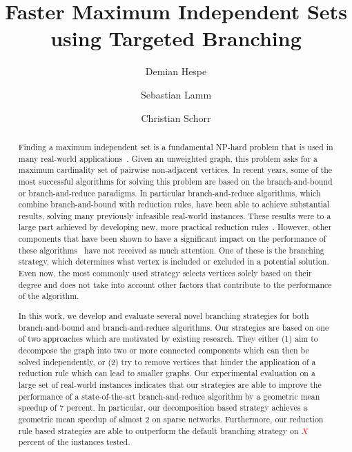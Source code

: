 \documentclass[a4paper,UKenglish,cleveref, autoref, thm-restate]{lipics-v2021}
\title{Faster Maximum Independent Sets using Targeted Branching} %
\author{Demian Hespe}{Karlsruhe Institute of Technology, Institute for
  Theoretical Informatics, Germany}{hespe@kit.edu}{https://orcid.org/0000-0001-6232-2951}{}
\author{Sebastian Lamm}{Karlsruhe Institute of Technology, Institute for
  Theoretical Informatics, Germany}{lamm@kit.edu}{}{\todo{Add funding}}
\author{Christian Schorr}{Karlsruhe Institute of Technology, Institute for
  Theoretical Informatics, Germany}{christian.schorr@student.kit.edu}{}{}
\begin{document}
\maketitle

\begin{abstract}
  Finding a maximum independent set is a fundamental NP-hard problem that is used in many real-world applications~\cite{BIO1,BIO2,RP,NW,CG}.
Given an unweighted graph, this problem asks for a maximum cardinality set of pairwise non-adjacent vertices.
In recent years, some of the most successful algorithms for solving this problem are based on the branch-and-bound or branch-and-reduce paradigms.
In particular branch-and-reduce algorithms, which combine branch-and-bound with reduction rules, have been able to achieve substantial results, solving many previously infeasible real-world instances.
These results were to a large part achieved by developing new, more practical reduction rules~\cite{alsahafy2020computing,ChangKern,dahlum2016accelerating,hespe2019scalable}.
However, other components that have been shown to have a significant impact on the performance of these algorithms~\cite{AkibaIwata} have not received as much attention.
One of these is the branching strategy, which determines what vertex is included or excluded in a potential solution.
Even now, the most commonly used strategy selects vertices solely based on their degree and does not take into account other factors that contribute to the performance of the algorithm.

In this work, we develop and evaluate several novel branching strategies for both branch-and-bound and branch-and-reduce algorithms.
Our strategies are based on one of two approaches which are motivated by existing research. 
They either (1) aim to decompose the graph into two or more connected components which can then be solved independently, or (2) try to remove vertices that hinder the application of a reduction rule which can lead to smaller graphs.
Our experimental evaluation on a large set of real-world instances indicates
that our strategies are able to improve the performance of a state-of-the-art
branch-and-reduce algorithm by a geometric mean speedup of $7$ percent. In particular, our
decomposition based strategy achieves a geometric mean speedup of almost 2 on sparse networks.
Furthermore, our reduction rule based strategies are able to outperform the default branching strategy on \textcolor{red}{$X$} percent of the instances tested.

\end{abstract}
\end{document}
